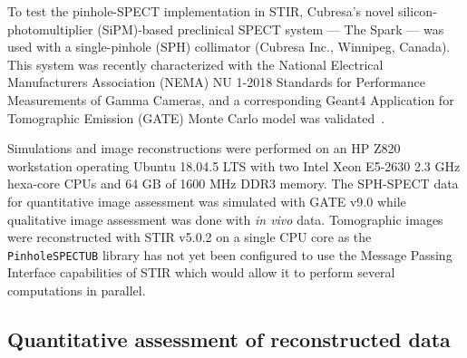 \documentclass[utf8]{FrontiersinVancouver}
\begin{document}
To test the pinhole-SPECT implementation in STIR, Cubresa's novel silicon-photomultiplier (SiPM)-based preclinical SPECT system --- The Spark --- was used with a single-pinhole (SPH) collimator (Cubresa Inc., Winnipeg, Canada). This system was recently characterized with the National Electrical Manufacturers Association (NEMA) NU 1-2018 Standards for Performance Measurements of Gamma Cameras, and a corresponding Geant4 Application for Tomographic Emission (GATE) Monte Carlo model was validated~\citep{strugari_nema_2022}.

Simulations and image reconstructions were performed on an HP Z820 workstation operating Ubuntu 18.04.5 LTS with two Intel Xeon E5-2630 2.3 GHz hexa-core CPUs and 64 GB of 1600 MHz DDR3 memory. The SPH-SPECT data for quantitative image assessment was simulated with GATE v9.0 while qualitative image assessment was done with \textit{in vivo} data. Tomographic images were reconstructed with STIR v5.0.2 on a single CPU core as the \texttt{PinholeSPECTUB} library has not yet been configured to use the Message Passing Interface capabilities of STIR which would allow it to perform several computations in parallel.

\subsection{Quantitative assessment of reconstructed data}




\end{document}
